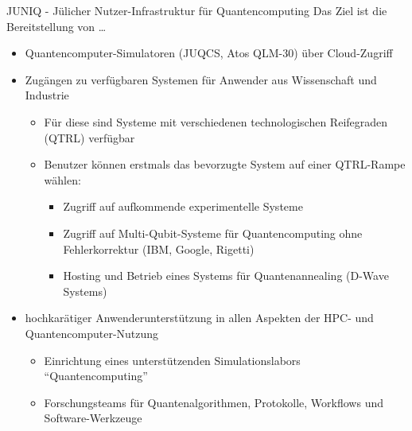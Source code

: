 \begin{jsc}{JUNIQ - Jülicher Nutzer-Infrastruktur für Quantencomputing}
    Das Ziel ist die Bereitstellung von \ldots
    \begin{itemize}[\ldots]
        \item Quantencomputer-Simulatoren (JUQCS, Atos QLM-30) über Cloud-Zugriff
        \item Zugängen zu verfügbaren Systemen für Anwender aus Wissenschaft und Industrie
        \begin{itemize}
            \item Für diese sind Systeme mit verschiedenen technologischen Reifegraden (QTRL) verfügbar
            \item Benutzer können erstmals das bevorzugte System auf einer QTRL-Rampe wählen:
            \begin{itemize}
                \item Zugriff auf aufkommende experimentelle Systeme
                \item Zugriff auf Multi-Qubit-Systeme für Quantencomputing ohne Fehlerkorrektur (IBM, Google, Rigetti)
                \item Hosting und Betrieb eines Systems für Quantenannealing (D-Wave Systems)
            \end{itemize}
        \end{itemize}
        \item hochkarätiger Anwenderunterstützung in allen Aspekten der HPC- und Quantencomputer-Nutzung
        \begin{itemize}
            \item Einrichtung eines unterstützenden Simulationslabors \enquote{Quantencomputing}
            \item Forschungsteams für Quantenalgorithmen, Protokolle, Workflows und Software-Werkzeuge
        \end{itemize} 
    \end{itemize}    
\end{jsc}